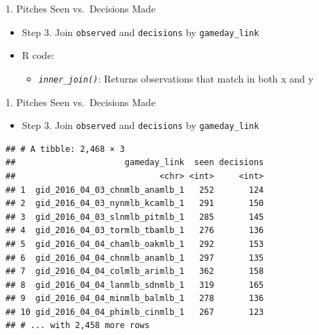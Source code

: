 \begin{frame}[fragile]{1. Pitches Seen vs.~Decisions Made}

\begin{itemize}
\tightlist
\item
  Step 3. Join \texttt{observed} and \texttt{decisions} by
  \texttt{gameday\_link}
\item
  R code:

  \begin{itemize}
  \tightlist
  \item
    \emph{\texttt{inner\_join()}}: Returns observations that match in
    both x and y
  \end{itemize}
\end{itemize}

\footnotesize

\begin{Shaded}
\begin{Highlighting}[]
\StringTok{ } \NormalTok{)}
\end{Highlighting}
\end{Shaded}

\end{frame}

\begin{frame}[fragile]{1. Pitches Seen vs.~Decisions Made}

\begin{itemize}
\tightlist
\item
  Step 3. Join \texttt{observed} and \texttt{decisions} by
  \texttt{gameday\_link}
\end{itemize}

\footnotesize

\begin{Shaded}
\begin{Highlighting}[]
\StringTok{ } \NormalTok{))}
\end{Highlighting}
\end{Shaded}

\begin{verbatim}
## # A tibble: 2,468 × 3
##                      gameday_link  seen decisions
##                             <chr> <int>     <int>
## 1  gid_2016_04_03_chnmlb_anamlb_1   252       124
## 2  gid_2016_04_03_nynmlb_kcamlb_1   291       150
## 3  gid_2016_04_03_slnmlb_pitmlb_1   285       145
## 4  gid_2016_04_03_tormlb_tbamlb_1   276       136
## 5  gid_2016_04_04_chamlb_oakmlb_1   292       153
## 6  gid_2016_04_04_chnmlb_anamlb_1   297       135
## 7  gid_2016_04_04_colmlb_arimlb_1   362       158
## 8  gid_2016_04_04_lanmlb_sdnmlb_1   319       165
## 9  gid_2016_04_04_minmlb_balmlb_1   278       136
## 10 gid_2016_04_04_phimlb_cinmlb_1   267       123
## # ... with 2,458 more rows
\end{verbatim}

\end{frame}

